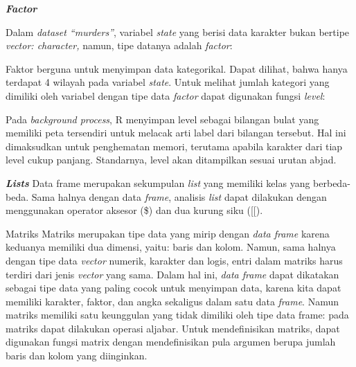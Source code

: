 \documentclass[
]{article}
\newenvironment{Shaded}{\begin{snugshade}}{\end{snugshade}}
\newcommand{\CommentTok}[1]{\textcolor[rgb]{0.56,0.35,0.01}{\textit{#1}}}
\newcommand{\FunctionTok}[1]{\textcolor[rgb]{0.00,0.00,0.00}{#1}}
\newcommand{\NormalTok}[1]{#1}
\newcommand{\SpecialCharTok}[1]{\textcolor[rgb]{0.00,0.00,0.00}{#1}}
\begin{document}
\textbf{\emph{Factor}}

Dalam \emph{dataset ``murders''}, variabel \emph{state} yang berisi data
karakter bukan bertipe \emph{vector: character,} namun, tipe datanya
adalah \emph{factor}:

\begin{Shaded}
\end{Shaded}

Faktor berguna untuk menyimpan data kategorikal. Dapat dilihat, bahwa
hanya terdapat 4 wilayah pada variabel \emph{state}. Untuk melihat
jumlah kategori yang dimiliki oleh variabel dengan tipe data
\emph{factor} dapat digunakan fungsi \emph{level}:

\begin{Shaded}
\end{Shaded}

Pada \emph{background process}, R menyimpan level sebagai bilangan bulat
yang memiliki peta tersendiri untuk melacak arti label dari bilangan
tersebut. Hal ini dimaksudkan untuk penghematan memori, terutama apabila
karakter dari tiap level cukup panjang. Standarnya, level akan
ditampilkan sesuai urutan abjad.

\textbf{\emph{Lists}} Data frame merupakan sekumpulan \emph{list} yang
memiliki kelas yang berbeda-beda. Sama halnya dengan data \emph{frame},
analisis \emph{list} dapat dilakukan dengan menggunakan operator aksesor
(\$) dan dua kurung siku ({[}{[}).

Matriks Matriks merupakan tipe data yang mirip dengan \emph{data frame}
karena keduanya memiliki dua dimensi, yaitu: baris dan kolom. Namun,
sama halnya dengan tipe data \emph{vector} numerik, karakter dan logis,
entri dalam matriks harus terdiri dari jenis \emph{vector} yang sama.
Dalam hal ini, \emph{data frame} dapat dikatakan sebagai tipe data yang
paling cocok untuk menyimpan data, karena kita dapat memiliki karakter,
faktor, dan angka sekaligus dalam satu data \emph{frame}. Namun matriks
memiliki satu keunggulan yang tidak dimiliki oleh tipe data frame: pada
matriks dapat dilakukan operasi aljabar. Untuk mendefinisikan matriks,
dapat digunakan fungsi matrix dengan mendefinisikan pula argumen berupa
jumlah baris dan kolom yang diinginkan.
\end{document}
